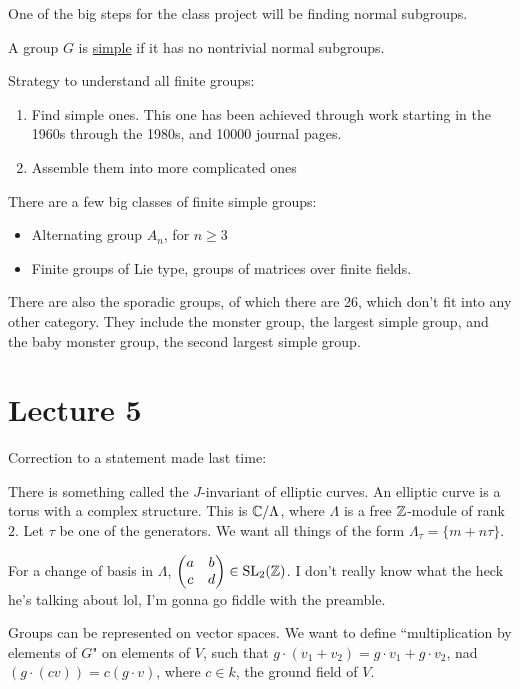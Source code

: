 \documentclass[x11names,reqno,14pt]{extarticle}
\begin{document}
One of the big steps for the class project will be finding normal subgroups. 

 A group $G$ is \underline{simple} if it has no nontrivial normal subgroups. 

Strategy to understand all finite groups: 
\begin{enumerate}
\item Find simple ones. This one has been achieved through work starting in the 1960s through the 1980s, and 10000 journal pages. 
\item Assemble them into more complicated ones
\end{enumerate}

There are a few big classes of finite simple groups: 
\begin{itemize}
\item Alternating group $A_n$, for $n \geq 3$
\item Finite groups of Lie type, groups of matrices over finite fields.  
\end{itemize}

There are also the sporadic groups, of which there are 26, which don't fit into any other category. They include the monster group, the largest simple group, and the baby monster group, the second largest simple group. 

\section*{Lecture 5}

Correction to a statement made last time: 

There is something called the $J$-invariant of elliptic curves. An elliptic curve is a torus with a complex structure. This is $\mathbb{C}/\Lambda$, where $\Lambda$ is a free $\mathbb{Z}$-module of rank $2$. Let $\tau$ be one of the generators. We want all things of the form $\Lambda_\tau = \{m + n\tau\}$. 

For a change of basis in $\Lambda$, $\begin{pmatrix} a & b \\ c & d \end{pmatrix} \in {\mathrm{SL}}_2(\mathbb{Z})$. I don't really know what the heck he's talking about lol, I'm gonna go fiddle with the preamble. 

Groups can be represented on vector spaces. We want to define ``multiplication by elements of $G$" on elements of $V$, such that $g\cdot(v_1 + v_2) = g\cdot v_1 + g\cdot v_2$, nad $(g\cdot(cv)) = c(g\cdot v)$, where $c \in k$, the ground field of $V$. 
\end{document}
